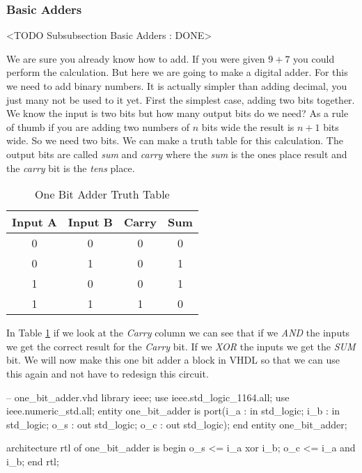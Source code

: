 \subsubsection{Basic Adders}
	<TODO Subsubsection  Basic Adders : DONE>

We are sure you already know how to add. If you were given $9+7$ you could perform the calculation. But here we are going to make a digital adder. For this we need to add binary numbers. It is actually simpler than adding decimal, you just many not be used to it yet. First the simplest case, adding two bits together. We know the input is two bits but how many output bits do we need? As a rule of thumb if you are adding two numbers of $n$ bits wide the result is $n+1$ bits wide. So we need two bits. We can make a truth table for this calculation. The output bits are called \emph{sum} and \emph{carry} where the \emph{sum} is the ones place result and the \emph{carry} bit is the \emph{tens} place.

\begin{table}[h!]  
\begin{center}    
\caption{One Bit Adder Truth Table} 
\label{tab:tt2ba} 
\begin{tabular}{|c|c|c|c|}  
\textbf{Input A} & \textbf{Input B} & \textbf{Carry} & \textbf{Sum}\\  
\hline  
0 & 0 & 0 & 0\\  
0 & 1 & 0 & 1\\  
1 & 0 & 0 & 1\\  
1 & 1 & 1 & 0\\ 
\end{tabular}  
\end{center}
\end{table}
	
In Table \ref{tab:tt2ba} if we look at the \emph{Carry} column we can see that if we \emph{AND} the inputs we get the correct result for the \emph{Carry} bit. If we \emph{XOR} the inputs we get the \emph{SUM} bit. We will now make this one bit adder a block in \ac{VHDL} so that we can use this again and not have to redesign this circuit.

\begin{VHDLlisting}[tabsize=4]
-- one_bit_adder.vhd
library ieee; 
    use ieee.std_logic_1164.all; 
    use ieee.numeric_std.all; 
entity one_bit_adder is
port(i_a : in    std_logic;  
     i_b : in    std_logic;  
     o_s :   out std_logic;  
     o_c :   out std_logic);
end entity one_bit_adder;

architecture rtl of one_bit_adder is
begin 
    o_s <= i_a xor i_b; 
    o_c <= i_a and i_b;
end rtl;
\end{VHDLlisting}

